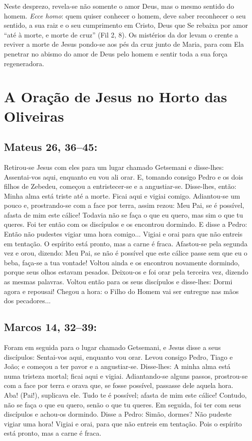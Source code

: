 \documentclass[10pt,a5paper]{book}
\newcommand{\from}[1]{\subsection*{#1}}
\begin{document}
Neste desprezo, revela-se não somente o amor Deus, mas o mesmo sentido do homem.
\emph{Ecce homo}:
quem quiser conhecer o homem, deve saber reconhecer o seu sentido, a sua raiz e o seu cumprimento em Cristo, Deus que Se rebaixa por amor ``até à morte, e morte de cruz'' (Fil 2, 8).
Os mistérios da dor levam o crente a reviver a morte de Jesus pondo-se aos pés da cruz junto de Maria, para com Ela penetrar no abismo do amor de Deus pelo homem e sentir toda a sua força regeneradora.


\section{A Oração de Jesus no Horto das Oliveiras}

\from{Mateus 26, 36--45:}

Retirou-se Jesus com eles para um lugar chamado Getsemani e disse-lhes:
Assentai-vos aqui, enquanto eu vou ali orar.
E, tomando consigo Pedro e os dois filhos de Zebedeu, começou a entristecer-se e a angustiar-se.
Disse-lhes, então:
Minha alma está triste até a morte.
Ficai aqui e vigiai comigo.
Adiantou-se um pouco e, prostrando-se com a face por terra, assim rezou:
Meu Pai, se é possível, afasta de mim este cálice! Todavia não se faça o que eu quero, mas sim o que tu queres.
Foi ter então com os discípulos e os encontrou dormindo.
E disse a Pedro:
Então não pudestes vigiar uma hora comigo...
Vigiai e orai para que não entreis em tentação.
O espírito está pronto, mas a carne é fraca.
Afastou-se pela segunda vez e orou, dizendo:
Meu Pai, se não é possível que este cálice passe sem que eu o beba, faça-se a tua vontade!
Voltou ainda e os encontrou novamente dormindo, porque seus olhos estavam pesados.
Deixou-os e foi orar pela terceira vez, dizendo as mesmas palavras.
Voltou então para os seus discípulos e disse-lhes:
Dormi agora e repousai! Chegou a hora:
o Filho do Homem vai ser entregue nas mãos dos pecadores...

\from{Marcos 14, 32--39:}

Foram em seguida para o lugar chamado Getsemani, e Jesus disse a seus discípulos:
Sentai-vos aqui, enquanto vou orar.
Levou consigo Pedro, Tiago e João;
e começou a ter pavor e a angustiar-se.
Disse-lhes:
A minha alma está numa tristeza mortal;
ficai aqui e vigiai.
Adiantando-se alguns passos, prostrou-se com a face por terra e orava que, se fosse possível, passasse dele aquela hora.
Aba! (Pai!), suplicava ele.
Tudo te é possível;
afasta de mim este cálice! Contudo, não se faça o que eu quero, senão o que tu queres.
Em seguida, foi ter com seus discípulos e achou-os dormindo.
Disse a Pedro:
Simão, dormes? Não pudeste vigiar uma hora!
Vigiai e orai, para que não entreis em tentação.
Pois o espírito está pronto, mas a carne é fraca.
\end{document}
